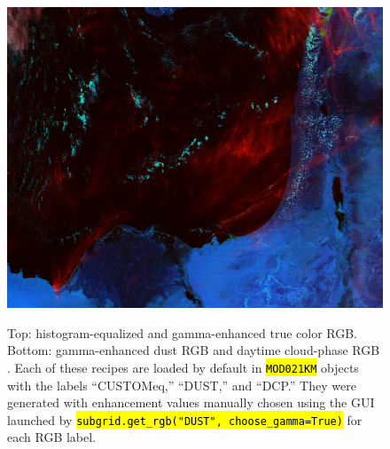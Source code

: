 \documentclass[12pt]{article}
\newcommand{\hltexttt}[1]{\texttt{\hl{#1}}}
\begin{document}
\begin{figure}[h!]
\begin{center}
{            \includegraphics[width=.4\paperwidth]{figs/rgbs/rgb_DCP.png}
        }
    \end{center}

    \caption{Top: histogram-equalized and gamma-enhanced true color RGB. Bottom: gamma-enhanced dust RGB \cite{fuell2016} and daytime cloud-phase RGB \cite{torres2021}. Each of these recipes are loaded by default in \hltexttt{MOD021KM} objects with the labels ``CUSTOMeq,'' ``DUST,'' and ``DCP.'' They were generated with enhancement values manually chosen using the GUI launched by \hltexttt{subgrid.get\_rgb("DUST", choose\_gamma=True)} for each RGB label.}
    \label{region_rgbs}
\end{figure}
\end{document}
